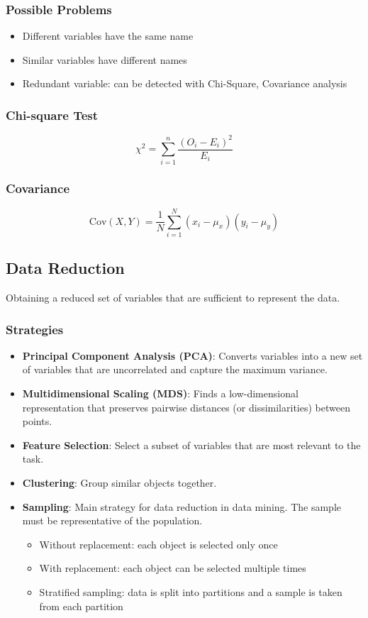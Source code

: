\subsubsection*{Possible Problems}
\begin{itemize}[noitemsep]
    \item Different variables have the same name
    \item Similar variables have different names
    \item Redundant variable: can be detected with Chi-Square, Covariance analysis
\end{itemize}

\subsubsection*{Chi-square Test}
$$\chi^2 = \sum_{i=1}^{n} \frac{(O_i - E_i)^2}{E_i}$$

\subsubsection*{Covariance}
$$\text{Cov}(X, Y) = \frac{1}{N} \sum_{i=1}^{N} (x_i - \mu_x)(y_i - \mu_y)$$

\subsection*{Data Reduction}
Obtaining a reduced set of variables that are sufficient to represent the data.

\subsubsection*{Strategies}
\begin{itemize}[noitemsep]
    \item \textbf{Principal Component Analysis (PCA)}: Converts variables into a new set of variables that are uncorrelated and capture the maximum variance.
    \item \textbf{Multidimensional Scaling (MDS)}: Finds a low-dimensional representation that preserves pairwise distances (or dissimilarities) between points.
    \item \textbf{Feature Selection}: Select a subset of variables that are most relevant to the task.
    \item \textbf{Clustering}: Group similar objects together.
    \item \textbf{Sampling}: Main strategy for data reduction in data mining. The sample must be representative of the population.
    \begin{itemize}
        \item Without replacement: each object is selected only once
        \item With replacement: each object can be selected multiple times
        \item Stratified sampling: data is split into partitions and a sample is taken from each partition
    \end{itemize}
\end{itemize}

